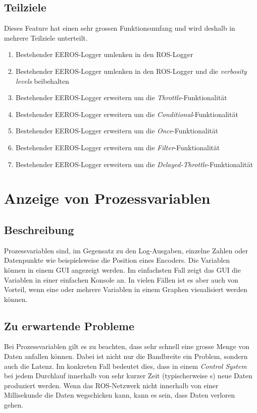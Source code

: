 \subsection{Teilziele}
Dieses Feature hat einen sehr grossen Funktionsumfang und wird deshalb in mehrere Teilziele unterteilt.
\begin{enumerate}
\item Bestehender EEROS-Logger umlenken in den ROS-Logger
\item Bestehender EEROS-Logger umlenken in den ROS-Logger und die \textit{verbosity levels} beibehalten
\item Bestehender EEROS-Logger erweitern um die \textit{Throttle}-Funktionalität
\item Bestehender EEROS-Logger erweitern um die \textit{Conditional}-Funktionalität
\item Bestehender EEROS-Logger erweitern um die \textit{Once}-Funktionalität
\item Bestehender EEROS-Logger erweitern um die \textit{Filter}-Funktionalität
\item Bestehender EEROS-Logger erweitern um die \textit{Delayed-Throttle}-Funktionalität
\end{enumerate}


\section{Anzeige von Prozessvariablen}
\subsection{Beschreibung}
Prozessvariablen sind, im Gegensatz zu den Log-Ausgaben, einzelne Zahlen oder Datenpunkte wie beispielsweise die Position eines Encoders.
Die Variablen können in einem GUI angezeigt werden.
Im einfachsten Fall zeigt das GUI die Variablen in einer einfachen Konsole an.
In vielen Fällen ist es aber auch von Vorteil, wenn eine oder mehrere Variablen in einem Graphen visualisiert werden können.

\subsection{Zu erwartende Probleme}
Bei Prozessvariablen gilt es zu beachten, dass sehr schnell eine grosse Menge von Daten anfallen können.
Dabei ist nicht nur die Bandbreite ein Problem, sondern auch die Latenz.
Im konkreten Fall bedeutet dies, dass in einem \textit{Control System} bei jedem Durchlauf innerhalb von sehr kurzer Zeit (typischerweise \unit[1]{s}) neue Daten produziert werden.
Wenn das ROS-Netzwerk nicht innerhalb von einer Millisekunde die Daten wegschicken kann, kann es sein, dass Daten verloren gehen.

